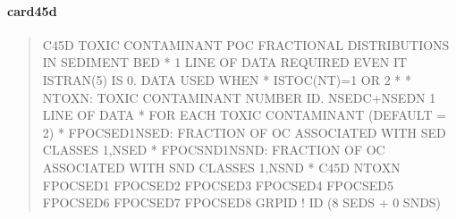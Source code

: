 \documentclass[letterpaper,10pt,english]{sphinxmanual}
\begin{document}
\paragraph{card45d}
\label{\detokenize{inputfiles/runcontrol/card45d:card45d}}\label{\detokenize{inputfiles/runcontrol/card45d::doc}}\begin{quote}

\begin{sphinxVerbatim}[commandchars=\\\{\}]
\PYGZhy{}\PYGZhy{}\PYGZhy{}\PYGZhy{}\PYGZhy{}\PYGZhy{}\PYGZhy{}\PYGZhy{}\PYGZhy{}\PYGZhy{}\PYGZhy{}\PYGZhy{}\PYGZhy{}\PYGZhy{}\PYGZhy{}\PYGZhy{}\PYGZhy{}\PYGZhy{}\PYGZhy{}\PYGZhy{}\PYGZhy{}\PYGZhy{}\PYGZhy{}\PYGZhy{}\PYGZhy{}\PYGZhy{}\PYGZhy{}\PYGZhy{}\PYGZhy{}\PYGZhy{}\PYGZhy{}\PYGZhy{}\PYGZhy{}\PYGZhy{}\PYGZhy{}\PYGZhy{}\PYGZhy{}\PYGZhy{}\PYGZhy{}\PYGZhy{}\PYGZhy{}\PYGZhy{}\PYGZhy{}\PYGZhy{}\PYGZhy{}\PYGZhy{}\PYGZhy{}\PYGZhy{}\PYGZhy{}\PYGZhy{}\PYGZhy{}\PYGZhy{}\PYGZhy{}\PYGZhy{}\PYGZhy{}\PYGZhy{}\PYGZhy{}\PYGZhy{}\PYGZhy{}\PYGZhy{}\PYGZhy{}\PYGZhy{}\PYGZhy{}\PYGZhy{}\PYGZhy{}\PYGZhy{}\PYGZhy{}\PYGZhy{}\PYGZhy{}\PYGZhy{}\PYGZhy{}\PYGZhy{}\PYGZhy{}\PYGZhy{}\PYGZhy{}\PYGZhy{}\PYGZhy{}\PYGZhy{}
C45D TOXIC CONTAMINANT POC FRACTIONAL DISTRIBUTIONS IN SEDIMENT BED
*   1 LINE  OF DATA REQUIRED EVEN IT ISTRAN(5) IS 0. DATA USED WHEN
*   ISTOC(NT)=1 OR 2
*
*     NTOXN:      TOXIC CONTAMINANT NUMBER ID.  NSEDC+NSEDN 1 LINE OF DATA
*                FOR EACH TOXIC CONTAMINANT (DEFAULT = 2)
* FPOCSED1\PYGZhy{}NSED: FRACTION OF OC ASSOCIATED WITH SED CLASSES 1,NSED
* FPOCSND1\PYGZhy{}NSND: FRACTION OF OC ASSOCIATED WITH SND CLASSES 1,NSND
*
C45D     NTOXN  FPOCSED1  FPOCSED2  FPOCSED3  FPOCSED4  FPOCSED5  FPOCSED6  FPOCSED7  FPOCSED8      GRPID ! ID (8 SEDS + 0 SNDS)
\end{sphinxVerbatim}
\end{quote}
\end{document}
